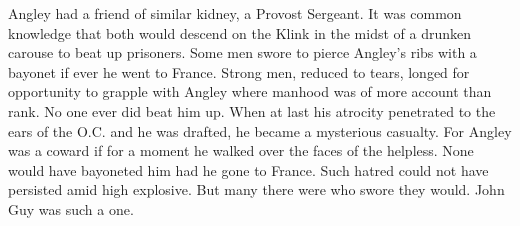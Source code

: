 Angley had a friend of similar kidney, a Provost Sergeant. It was common knowledge 
that both would descend on the Klink in the midst of a drunken carouse to beat up 
prisoners. Some men swore to pierce Angley's ribs with a bayonet if ever he went to 
France. Strong men, reduced to tears, longed for opportunity to grapple with Angley 
where manhood was of more account than rank. No one ever did beat him up. When at last 
his atrocity penetrated to the ears of the O.C. and he was drafted, he became a 
mysterious casualty. For Angley was a coward if for a moment he walked over the 
faces of the helpless. None would have bayoneted him had he gone to France. Such 
hatred could not have persisted amid high explosive. But many there were who 
swore they would. John Guy was such a one.